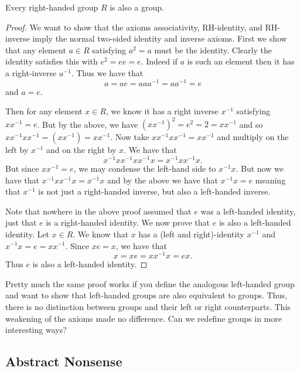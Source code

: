 \documentclass{article}
\begin{document}
\begin{theorem}
  Every right-handed group $R$ is also a group.
\end{theorem}
\begin{proof}
  We want to show that the axioms associativity, RH-identity, and RH-inverse imply the normal two-sided identity and inverse axioms.
  First we show that any element $a \in R$ satisfying $a^{2} = a$ must be the identity.
  Clearly the identity satisfies this with $e^{2} = ee = e$.
  Indeed if $a$ is such an element then it has a right-inverse $a^{-1}$.
  Thus we have that
  \[
    a = ae = a a a^{-1} = a a^{-1} = e
  \]
  and $a = e$.

  Then for any element $x \in R$, we know it has a right inverse $x^{-1}$ satisfying $x x^{-1} = e$.
  But by the above, we have $\left(x x^{-1}\right)^{2} = e^{2} = 2 = x x^{-1}$ and so $x x^{-1} x x^{-1} = \left( x x^{-1} \right) = x x^{-1}$.
  Now take $x x^{-1} x x^{-1} = x x^{-1}$ and multiply on the left by $x^{-1}$ and on the right by $x$.
  We have that
  \[
    x^{-1} x x^{-1} x x^{-1} x = x^{-1} x x^{-1} x.
  \]
  But since $x x^{-1} = e$, we may condense the left-hand side to $x^{-1} x$.
  But now we have that $x^{-1} x x^{-1} x = x^{-1} x$ and by the above we have that $x^{-1} x = e$ meaning that $x^{-1}$ is not just a right-handed inverse, but also a left-handed inverse.

  Note that nowhere in the above proof assumed that $e$ was a left-handed identity, just that $e$ is a right-handed identity.
  We now prove that $e$ is also a left-handed identity.
  Let $x \in R$.
  We know that $x$ has a (left and right)-identity $x^{-1}$ and $x^{-1} x = e = x x^{-1}$.
  Since $x e = x$, we have that
  \[
    x = x e = x x^{-1} x = e x.
  \]
  Thus $e$ is also a left-handed identity.
\end{proof}

Pretty much the same proof works if you define the analogous left-handed group and want to show that left-handed groups are also equivalent to groups.
Thus, there is no distinction between groups and their left or right counterparts.
This weakening of the axioms made no difference.
Can we redefine groups in more interesting ways?

\subsection*{Abstract Nonsense}
\end{document}
